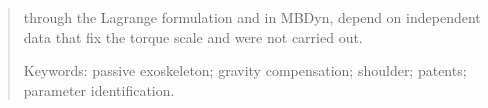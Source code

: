 \begin{abstract}
through the Lagrange formulation and in MBDyn, depend on independent data that fix the torque scale and were not carried out.

\bigskip\noindent Keywords: passive exoskeleton; gravity compensation; shoulder; patents; parameter identification.
\end{abstract}


